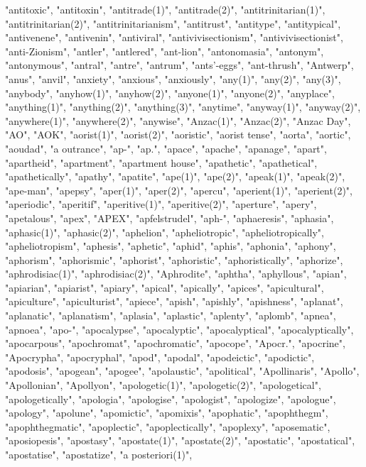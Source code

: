 "antitoxic",
"antitoxin",
"antitrade(1)",
"antitrade(2)",
"antitrinitarian(1)",
"antitrinitarian(2)",
"antitrinitarianism",
"antitrust",
"antitype",
"antitypical",
"antivenene",
"antivenin",
"antiviral",
"antivivisectionism",
"antivivisectionist",
"anti-Zionism",
"antler",
"antlered",
"ant-lion",
"antonomasia",
"antonym",
"antonymous",
"antral",
"antre",
"antrum",
"ants'-eggs",
"ant-thrush",
"Antwerp",
"anus",
"anvil",
"anxiety",
"anxious",
"anxiously",
"any(1)",
"any(2)",
"any(3)",
"anybody",
"anyhow(1)",
"anyhow(2)",
"anyone(1)",
"anyone(2)",
"anyplace",
"anything(1)",
"anything(2)",
"anything(3)",
"anytime",
"anyway(1)",
"anyway(2)",
"anywhere(1)",
"anywhere(2)",
"anywise",
"Anzac(1)",
"Anzac(2)",
"Anzac Day",
"AO",
"AOK",
"aorist(1)",
"aorist(2)",
"aoristic",
"aorist tense",
"aorta",
"aortic",
"aoudad",
"a outrance",
"ap-",
"ap.",
"apace",
"apache",
"apanage",
"apart",
"apartheid",
"apartment",
"apartment house",
"apathetic",
"apathetical",
"apathetically",
"apathy",
"apatite",
"ape(1)",
"ape(2)",
"apeak(1)",
"apeak(2)",
"ape-man",
"apepsy",
"aper(1)",
"aper(2)",
"apercu",
"aperient(1)",
"aperient(2)",
"aperiodic",
"aperitif",
"aperitive(1)",
"aperitive(2)",
"aperture",
"apery",
"apetalous",
"apex",
"APEX",
"apfelstrudel",
"aph-",
"aphaeresis",
"aphasia",
"aphasic(1)",
"aphasic(2)",
"aphelion",
"apheliotropic",
"apheliotropically",
"apheliotropism",
"aphesis",
"aphetic",
"aphid",
"aphis",
"aphonia",
"aphony",
"aphorism",
"aphorismic",
"aphorist",
"aphoristic",
"aphoristically",
"aphorize",
"aphrodisiac(1)",
"aphrodisiac(2)",
"Aphrodite",
"aphtha",
"aphyllous",
"apian",
"apiarian",
"apiarist",
"apiary",
"apical",
"apically",
"apices",
"apicultural",
"apiculture",
"apiculturist",
"apiece",
"apish",
"apishly",
"apishness",
"aplanat",
"aplanatic",
"aplanatism",
"aplasia",
"aplastic",
"aplenty",
"aplomb",
"apnea",
"apnoea",
"apo-",
"apocalypse",
"apocalyptic",
"apocalyptical",
"apocalyptically",
"apocarpous",
"apochromat",
"apochromatic",
"apocope",
"Apocr.",
"apocrine",
"Apocrypha",
"apocryphal",
"apod",
"apodal",
"apodeictic",
"apodictic",
"apodosis",
"apogean",
"apogee",
"apolaustic",
"apolitical",
"Apollinaris",
"Apollo",
"Apollonian",
"Apollyon",
"apologetic(1)",
"apologetic(2)",
"apologetical",
"apologetically",
"apologia",
"apologise",
"apologist",
"apologize",
"apologue",
"apology",
"apolune",
"apomictic",
"apomixis",
"apophatic",
"apophthegm",
"apophthegmatic",
"apoplectic",
"apoplectically",
"apoplexy",
"aposematic",
"aposiopesis",
"apostasy",
"apostate(1)",
"apostate(2)",
"apostatic",
"apostatical",
"apostatise",
"apostatize",
"a posteriori(1)",
